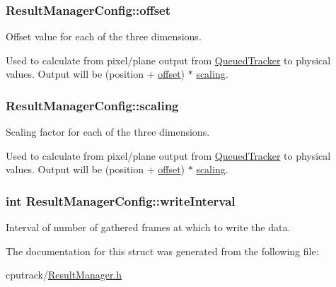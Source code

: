 \subsubsection[{\texorpdfstring{offset}{offset}}]{ Result\+Manager\+Config\+::offset}\hypertarget{struct_result_manager_config_ac7b28e680c90bc2a882a6e064d919a40}{}\label{struct_result_manager_config_ac7b28e680c90bc2a882a6e064d919a40}


Offset value for each of the three dimensions. 

Used to calculate from pixel/plane output from \hyperlink{class_queued_tracker}{Queued\+Tracker} to physical values. Output will be (position + \hyperlink{struct_result_manager_config_ac7b28e680c90bc2a882a6e064d919a40}{offset}) $\ast$ \hyperlink{struct_result_manager_config_abb553f047043e2bd16b27ba6221f358e}{scaling}. 
\subsubsection[{\texorpdfstring{scaling}{scaling}}]{ Result\+Manager\+Config\+::scaling}\hypertarget{struct_result_manager_config_abb553f047043e2bd16b27ba6221f358e}{}\label{struct_result_manager_config_abb553f047043e2bd16b27ba6221f358e}


Scaling factor for each of the three dimensions. 

Used to calculate from pixel/plane output from \hyperlink{class_queued_tracker}{Queued\+Tracker} to physical values. Output will be (position + \hyperlink{struct_result_manager_config_ac7b28e680c90bc2a882a6e064d919a40}{offset}) $\ast$ \hyperlink{struct_result_manager_config_abb553f047043e2bd16b27ba6221f358e}{scaling}. 
\subsubsection[{\texorpdfstring{write\+Interval}{writeInterval}}]{\setlength{\rightskip}{0pt plus 5cm}int Result\+Manager\+Config\+::write\+Interval}\hypertarget{struct_result_manager_config_a24c57e2403e5012fc5900924db770611}{}\label{struct_result_manager_config_a24c57e2403e5012fc5900924db770611}


Interval of number of gathered frames at which to write the data. 



The documentation for this struct was generated from the following file\+:\begin{DoxyCompactItemize}
\item 
cputrack/\hyperlink{_result_manager_8h}{Result\+Manager.\+h}\end{DoxyCompactItemize}
